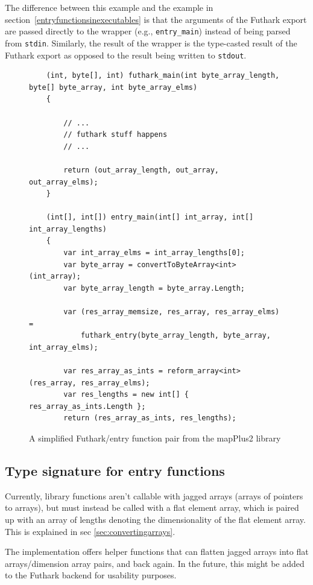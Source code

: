 The difference between this example and the example in 
section~\ref{entryfunctionsinexecutables} is that the arguments of the Futhark export
are passed directly to the wrapper (e.g., {\tt entry\_main}) instead of being parsed
from {\tt stdin}. Similarly, the result of the wrapper is the type-casted result of
the Futhark export as opposed to the result being written to \texttt{stdout}.
\begin{figure}[H]
  \centering
\begin{verbatim}
    (int, byte[], int) futhark_main(int byte_array_length, byte[] byte_array, int byte_array_elms)
    {

        // ...
        // futhark stuff happens
        // ...

        return (out_array_length, out_array, out_array_elms);
    }

    (int[], int[]) entry_main(int[] int_array, int[] int_array_lengths)
    {
        var int_array_elms = int_array_lengths[0];
        var byte_array = convertToByteArray<int>(int_array);
        var byte_array_length = byte_array.Length;

        var (res_array_memsize, res_array, res_array_elms) =
            futhark_entry(byte_array_length, byte_array, int_array_elms);

        var res_array_as_ints = reform_array<int>(res_array, res_array_elms);
        var res_lengths = new int[] { res_array_as_ints.Length };
        return (res_array_as_ints, res_lengths);
\end{verbatim}
  \caption{A simplified Futhark/entry function pair from the mapPlus2 library}
  \label{fig:futharkentrypairlib}
\end{figure}

\subsection{Type signature for entry functions}
\label{subsec:flatarraysinentryfuncs}
Currently, library functions aren't callable with jagged arrays (arrays of 
pointers to arrays), but must instead be called with a flat element array,
which is paired up with an array of lengths denoting the dimensionality of 
the flat element array. This is explained in sec \ref{sec:convertingarrays}.

The \fshark{} implementation offers helper functions that can flatten jagged
arrays into flat arrays/dimension array pairs, and back again.
In the future, this might be added to the Futhark \csharp{} backend for
usability purposes.

